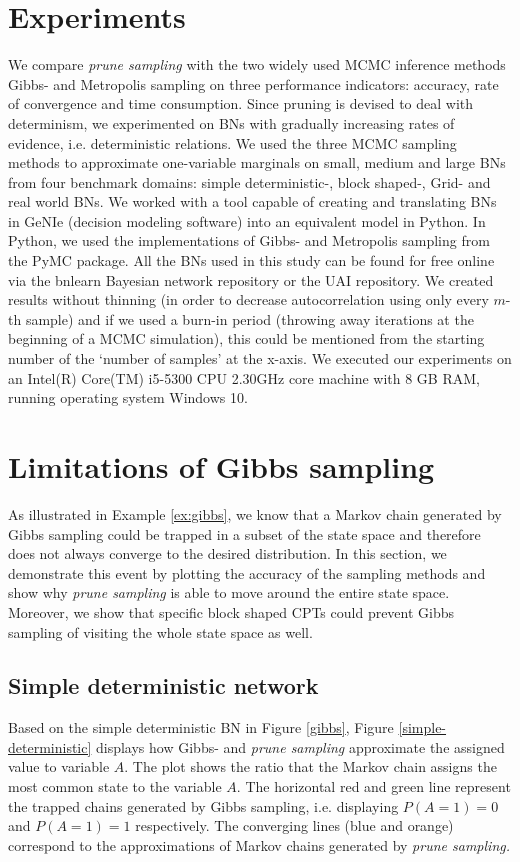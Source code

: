 \documentclass[a4paper, twoside, 11pt]{report}
\theoremstyle{plain}
\theoremstyle{definition}
\theoremstyle{remark}
\newcommand{\ps}{\textit{prune sampling }}
\newcommand{\psp}{\textit{prune sampling. }}
\begin{document}
\section{Experiments}
We compare \ps with the two widely used MCMC inference methods Gibbs- and Metropolis sampling on three performance indicators: accuracy, rate of convergence and time consumption. Since pruning is devised to deal with determinism, we experimented on BNs with gradually increasing rates of evidence, i.e. deterministic relations. We used the three MCMC sampling methods to approximate one-variable marginals on small, medium and large BNs from four benchmark domains: simple deterministic-, block shaped-, Grid- and real world BNs. We worked with a tool capable of creating and translating BNs in GeNIe (decision modeling software) into an equivalent model in Python. In Python, we used the implementations of Gibbs- and Metropolis sampling from the PyMC package. All the BNs used in this study can be found for free online via the bnlearn Bayesian network repository or the UAI repository. We created results without thinning (in order to decrease autocorrelation using only every $m$-th sample) and if we used a burn-in period (throwing away iterations at the beginning of a MCMC simulation), this could be mentioned from the starting number of the `number of samples' at the x-axis. We executed our experiments on an Intel(R) Core(TM) i5-5300 CPU 2.30GHz core machine with 8 GB RAM, running operating system Windows 10.

\section{Limitations of Gibbs sampling}
As illustrated in Example \ref{ex:gibbs}, we know that a Markov chain generated by Gibbs sampling could be trapped in a subset of the state space and therefore does not always converge to the desired distribution. In this section, we demonstrate this event by plotting the accuracy of the sampling methods and show why \ps is able to move around the entire state space. Moreover, we show that specific block shaped CPTs could prevent Gibbs sampling of visiting the whole state space as well. \\

\subsection{Simple deterministic network}
Based on the simple deterministic BN in Figure \ref{gibbs}, Figure \ref{simple-deterministic} displays how Gibbs- and \ps approximate the assigned value to variable $A$. The plot shows the ratio that the Markov chain assigns the most common state to the variable $A$. The horizontal red and green line represent the trapped chains generated by Gibbs sampling, i.e. displaying $P(A=1)=0$ and $P(A=1)=1$ respectively. The converging lines (blue and orange) correspond to the approximations of Markov chains generated by \psp \\
\end{document}
